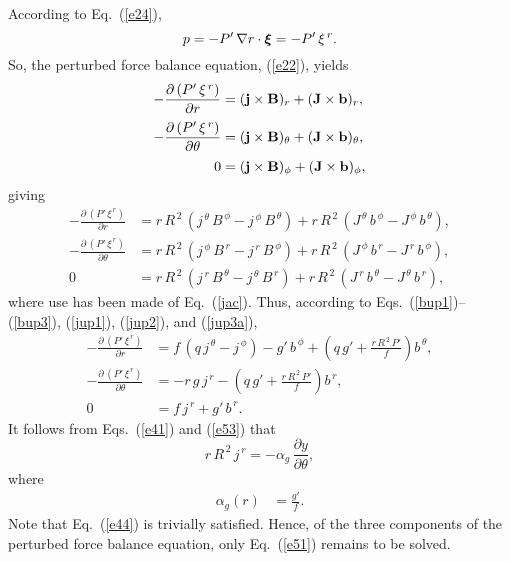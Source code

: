 \documentclass[12pt,prb,aps]{revtex4-1}
\newcommand {\bxi}{\mbox{\boldmath$\xi$}}
\begin{document}
According to Eq.~(\ref{e24}), 
\begin{equation}
p =-P'\,\nabla r\cdot\bxi=- P'\,\xi^{\,r}.
\end{equation}
So, the perturbed force balance equation, (\ref{e22}), yields
\begin{align}
-\frac{\partial\, (P'\,\xi^{\,r})}{\partial r} &= ({\bf j}\times {\bf B})_r+({\bf J}\times {\bf b})_r,\\[0.5ex]
-\frac{\partial\,(P'\,\xi^{\,r})}{\partial \theta}&= ({\bf j}\times {\bf B})_\theta+({\bf J}\times {\bf b})_\theta,\\[0.5ex]
0&= ({\bf j}\times {\bf B})_\phi+({\bf J}\times {\bf b})_\phi,
\end{align}
giving\,\cite{tj}
\begin{align}
-\frac{\partial\, (P'\,\xi^{\,r})}{\partial r} &=r\,R^{\,2}\,(j^{\,\theta}\,B^{\,\phi}-j^{\,\phi}\,B^{\,\theta}) + r\,R^{\,2}\,(J^{\,\theta}\,b^{\,\phi}-J^{\,\phi}\,b^{\,\theta}),\\[0.5ex]
-\frac{\partial\,(P'\,\xi^{\,r})}{\partial \theta}&=r\,R^{\,2}\,(j^{\,\phi}\,B^{\,r}-j^{\,r}\,B^{\,\phi}) + r\,R^{\,2}\,(J^{\,\phi}\,b^{\,r}-J^{\,r}\,b^{\,\phi}),\\[0.5ex]
0&=r\,R^{\,2}\,(j^{\,r}\,B^{\,\theta}-j^{\,\theta}\,B^{\,r}) + r\,R^{\,2}\,(J^{\,r}\,b^{\,\theta}-J^{\,\theta}\,b^{\,r}),
\end{align}
where use has been made of Eq.~(\ref{jac}). 
Thus, according to Eqs.~(\ref{bup1})--(\ref{bup3}), (\ref{jup1}), (\ref{jup2}), and (\ref{jup3a}), 
\begin{align}
-\frac{\partial\, (P'\,\xi^{\,r})}{\partial r} &= f\,(q\,j^{\,\theta} -j^{\,\phi}) - g'\,b^{\,\phi} + \left(q\,g'+\frac{r\,R^{\,2}\,P'}{f}\right)b^{\,\theta},\label{e51}\\[0.5ex]
-\frac{\partial\,(P'\,\xi^{\,r})}{\partial \theta}&=-r\,g\,j^{\,r} - \left(q\,g'+\frac{r\,R^{\,2}\,P'}{f}\right)b^{\,r},\label{e44}\\[0.5ex]
0&= f\,j^{\,r}+g'\,b^{\,r}.\label{e53}
\end{align}
It follows from Eqs.~(\ref{e41}) and (\ref{e53}) that 
\begin{equation}\label{e54}
r\,R^{\,2}\,j^{\,r} = -\alpha_g\,\frac{\partial y}{\partial\theta},
\end{equation}
where
\begin{align}
\alpha_g (r)&= \frac{g'}{f}.\label{ag}
\end{align}
Note that Eq.~(\ref{e44}) is trivially satisfied. Hence, of the three components of the perturbed force balance equation, only Eq.~(\ref{e51}) remains to be solved. 
\end{document}
